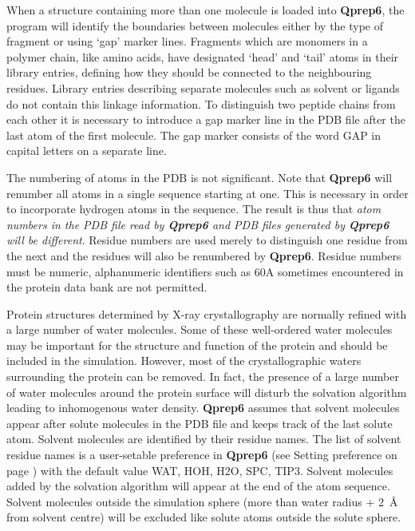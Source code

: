 \documentclass[a4paper,11pt]{article}
\begin{document}
When a structure containing more than one molecule is loaded into
\textbf{Qprep6}, the program will identify the boundaries between molecules
either by the type of fragment or using `gap' marker lines.
Fragments which are monomers in a polymer chain, like amino acids,
have designated `head' and `tail' atoms in their library entries,
defining how they should be connected to the neighbouring
residues. Library entries describing separate molecules such as
solvent or ligands do not contain this linkage information. To
distinguish two peptide chains from each other it is necessary to
introduce a gap marker line in the PDB file after the last atom of
the first molecule. The gap marker consists of the word GAP in
capital letters on a separate line.

The numbering of atoms in the PDB is not significant. Note that
\textbf{Qprep6} will renumber all atoms in a single sequence starting at
one. This is necessary in order to incorporate hydrogen atoms in
the sequence. The result is thus that \textit{atom numbers in the
PDB file read by \textbf{Qprep6} and PDB files generated by \textbf{Qprep6} will be
different}. Residue numbers are used merely to distinguish one
residue from the next and the residues will also be renumbered by
\textbf{Qprep6}. Residue numbers must be numeric, alphanumeric identifiers
such as 60A sometimes encountered in the protein data bank are not
permitted.

Protein structures  determined by  X-ray crystallography  are normally
refined  with  a  large  number  of water  molecules.  Some  of  these
well-ordered water  molecules may be  important for the  structure and
function   of   the   protein   and  should   be   included   in   the
simulation. However,  most of the crystallographic  waters surrounding
the protein can be removed. In fact, the presence of a large number of
water molecules around the protein  surface will disturb the solvation
algorithm  leading  to   inhomogenous  water  density.  \textbf{Qprep6}
assumes that  solvent molecules appear  after solute molecules  in the
PDB file and  keeps track of the last solute  atom.  Solvent molecules
are identified  by their  residue names. The  list of  solvent residue
names  is a  user-setable  preference in  \textbf{Qprep6} (see  Setting
preference on page \pageref{setting_pref}) with the default value WAT,
HOH,  H2O,  SPC,  TIP3.  Solvent  molecules  added  by  the  solvation
algorithm  will  appear at  the  end  of  the atom  sequence.  Solvent
molecules  outside the  simulation sphere  (more than  water radius  +
2~{\AA}  from  solvent centre)  will  be  excluded like  solute  atoms
outside the solute sphere.
\end{document}

